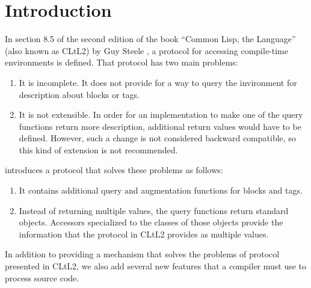 \chapter{Introduction}
%

In section 8.5 of the second edition of the book ``Common Lisp, the
Language'' (also known as CLtL2) by Guy Steele
\cite{Steele:1990:CLL:95411}, a protocol for accessing compile-time
environments is defined.  That protocol has two main problems:

\begin{enumerate}
\item It is incomplete.  It does not provide for a way to query the
  invironment for description about blocks or tags.
\item It is not extensible.  In order for an implementation to make
  one of the query functions return more description, additional
  return values would have to be defined.  However, such a change is
  not considered backward compatible, so this kind of extension is not
  recommended.
\end{enumerate}

\sysname{} introduces a protocol that solves these problems as
follows:

\begin{enumerate}
\item It contains additional query and augmentation functions for
  blocks and tags.
\item Instead of returning multiple values, the query functions return
  standard objects.  Accessors specialized to the classes of those
  objects provide the information that the protocol in CLtL2
  provides as multiple values.
\end{enumerate}

In addition to providing a mechanism that solves the problems of
protocol presented in CLtL2, we also add several new features that
a compiler must use to process source code.
